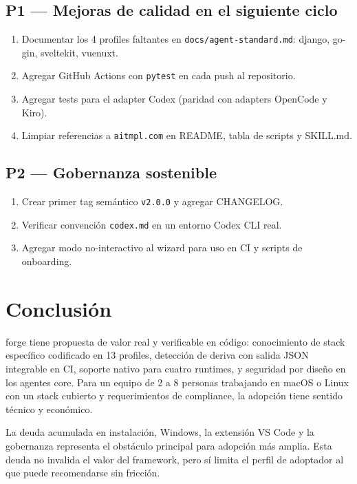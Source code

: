 \documentclass[11pt,a4paper]{article}
\begin{document}
\subsection{P1 — Mejoras de calidad en el siguiente ciclo}

\begin{enumerate}[leftmargin=1.5em]
  \item Documentar los 4 profiles faltantes en \texttt{docs/agent-standard.md}: django, go-gin, sveltekit, vuenuxt.
  \item Agregar GitHub Actions con \texttt{pytest} en cada push al repositorio.
  \item Agregar tests para el adapter Codex (paridad con adapters OpenCode y Kiro).
  \item Limpiar referencias a \texttt{aitmpl.com} en README, tabla de scripts y SKILL.md.
\end{enumerate}

\subsection{P2 — Gobernanza sostenible}

\begin{enumerate}[leftmargin=1.5em]
  \item Crear primer tag semántico \texttt{v2.0.0} y agregar CHANGELOG.
  \item Verificar convención \texttt{codex.md} en un entorno Codex CLI real.
  \item Agregar modo no-interactivo al wizard para uso en CI y scripts de onboarding.
\end{enumerate}

\section{Conclusión}

forge tiene propuesta de valor real y verificable en código: conocimiento de stack específico codificado en 13 profiles, detección de deriva con salida JSON integrable en CI, soporte nativo para cuatro runtimes, y seguridad por diseño en los agentes core. Para un equipo de 2 a 8 personas trabajando en macOS o Linux con un stack cubierto y requerimientos de compliance, la adopción tiene sentido técnico y económico.

La deuda acumulada en instalación, Windows, la extensión VS Code y la gobernanza representa el obstáculo principal para adopción más amplia. Esta deuda no invalida el valor del framework, pero sí limita el perfil de adoptador al que puede recomendarse sin fricción.
\end{document}
